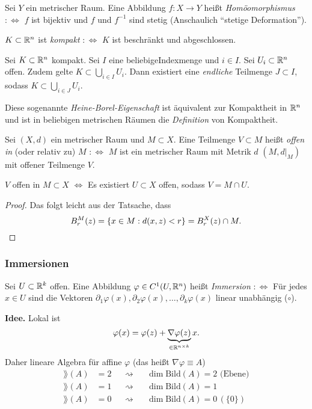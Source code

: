 Sei $Y$ ein metrischer Raum. Eine Abbildung $f: X \to Y$ heißt \emph{Homöomorphismus} $:\Leftrightarrow$ $f$ ist bijektiv und $f$ und $f^{-1}$ sind stetig (Anschaulich ``stetige Deformation'').

$K \subset \mathbb{R}^n$ ist \emph{kompakt} $:\Leftrightarrow$ $K$ ist beschränkt und abgeschlossen.

\begin{thm}
 Sei $K \subset \mathbb{R}^n$ kompakt. Sei $I$ eine beliebige\footnotemark Indexmenge und $i \in I$. Sei $U_i \subset \mathbb{R}^n$ offen. Zudem gelte $K \subset \bigcup_{i \in I} U_i$. Dann existiert eine \emph{endliche} Teilmenge $J \subset I$, sodass $K \subset \bigcup_{i \in J} U_i$.
\end{thm}

Diese sogenannte \emph{Heine-Borel-Eigenschaft} ist äquivalent zur Kompaktheit in $\mathbb{R}^n$ und ist in beliebigen metrischen Räumen die \emph{Definition} von Kompaktheit.

Sei $(X,d)$ ein metrischer Raum und $M \subset X$. Eine Teilmenge $V \subset M$ heißt \emph{offen in} (oder relativ zu) $M$ $:\Leftrightarrow$ $M$ ist ein metrischer Raum mit Metrik $d$ $(M,d|_M)$ mit offener Teilmenge $V$.

\begin{rmrk}
$V$ offen in $M \subset X$ $\Leftrightarrow$ Es existiert $U \subset X$ offen, sodass $V = M \cap U$.
\end{rmrk}

\begin{proof}
 Das folgt leicht aus der Tatsache, dass 
 \[ B_r^M(z) = \{ x \in M: d(x,z) < r \} = B_r^X(z) \cap M. \qedhere \]
\end{proof}

\subsubsection{Immersionen}
Sei $U \subset \mathbb{R}^k$ offen. Eine Abbildung $\varphi \in C^1(U, \mathbb{R}^n)$ heißt \emph{Immersion} $:\Leftrightarrow$ Für jedes $x \in U$ sind die Vektoren $\partial_1 \varphi(x), \partial_2 \varphi(x), \ldots, \partial_k \varphi(x)$ linear unabhängig ($\circ$).

\textbf{Idee.} Lokal ist 
\[ \varphi(x) = \varphi(z) + \underbrace{\nabla \varphi(z)}_{\in \mathbb{R}^{n \times k}} x. \]
Daher lineare Algebra für affine $\varphi$ (das heißt $\nabla\varphi \equiv A$)
\[ \begin{aligned}
   \rang(A) &= 2 & &\rightsquigarrow & &\dim \text{Bild}(A) = 2 \text{ (Ebene)} \\
   \rang(A) &= 1 & &\rightsquigarrow & &\dim \text{Bild}(A) = 1  \\
   \rang(A) &= 0 & &\rightsquigarrow & &\dim \text{Bild}(A) = 0 \, (\{0\})
   \end{aligned} \]
   
